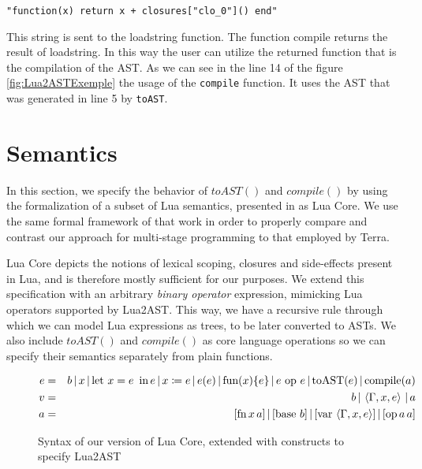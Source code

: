 \documentclass[english]{llncs}
\begin{document}
\begin{verbatim}
"function(x) return x + closures["clo_0"]() end"
\end{verbatim}


This string is sent to the loadstring function.
The function compile returns the result of loadstring.
In this way the user can utilize the returned function that is the compilation of the AST.
As we can see in the line 14 of the figure \ref{fig:Lua2ASTExemple} the usage of the \texttt{compile} function.
It uses the AST that was generated in line 5 by \texttt{toAST}.



\section{Semantics}
\label{sec:semantics}

In this section, we specify the behavior of $toAST()$ and $compile()$
by using the formalization of a subset of Lua semantics, presented
in \cite{DeVito2013Terra} as Lua Core. We use the same formal framework
of that work in order to properly compare and contrast our approach
for multi-stage programming to that employed by Terra.

Lua Core depicts the notions of lexical scoping, closures and side-effects
present in Lua, and is therefore mostly sufficient for our purposes.
We extend this specification with an arbitrary \emph{binary operator}
expression, mimicking Lua operators supported by Lua2AST. This way,
we have a recursive rule through which we can model Lua expressions
as trees, to be later converted to ASTs. We also include $toAST()$ and
$compile()$ as core language operations so we can specify their semantics
separately from plain functions.

\begin{figure}[t]
\begin{eqnarray*}
e & = & b\,|\, x\,|\,\mbox{let \ensuremath{x=e}\,\ in\,\ensuremath{e}}\,|\, x\coloneqq e\,|\, e(e)\,|\,\mbox{fun}(x)\{e\}\,|\, e\mbox{ op }e\,|\,\mbox{toAST}(e)\,|\,\mbox{compile}(a)\\
v & = & b\,|\,\left\langle \Gamma,x,e\right\rangle \,|\, a\\
a & = & [\mbox{fn\,\ensuremath{x}\,\ensuremath{a}}]\,|\,[\mbox{base \ensuremath{b}}]\,|\,[\mbox{var}\,\left\langle \Gamma,x,e\right\rangle ]\,|\,[\mbox{op\,\ensuremath{a}\,\ensuremath{a}}]
\end{eqnarray*}
\protect\caption{\label{fig:LuaCoreSyntax}Syntax of our version of Lua Core, extended
with constructs to specify Lua2AST}
\end{figure}
\end{document}
